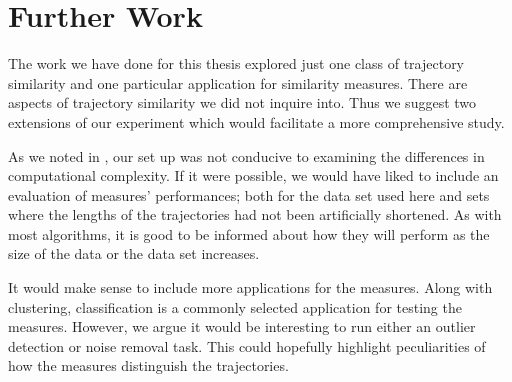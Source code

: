 
\clearpage
\section{Further Work}

The work we have done for this thesis explored just one class of trajectory similarity and one particular application for similarity measures.
There are aspects of trajectory similarity we did not inquire into. 
Thus we suggest two extensions of our experiment which would facilitate a more comprehensive study. 


As we noted in , our set up was not conducive to examining the differences in computational complexity. 
If it were possible, we would have liked to include an evaluation of measures’ performances; both for the data set used here and sets where the lengths of the trajectories had not been artificially shortened. 
As with most algorithms, it is good to be informed about how they will perform as the size of the data or the data set increases.



It would make sense to include more applications for the measures.
Along with clustering, classification is a commonly selected application for testing the measures. 
However, we argue it would be interesting to run either an outlier detection or noise removal task. 
This could hopefully highlight peculiarities of how the measures distinguish the trajectories.





